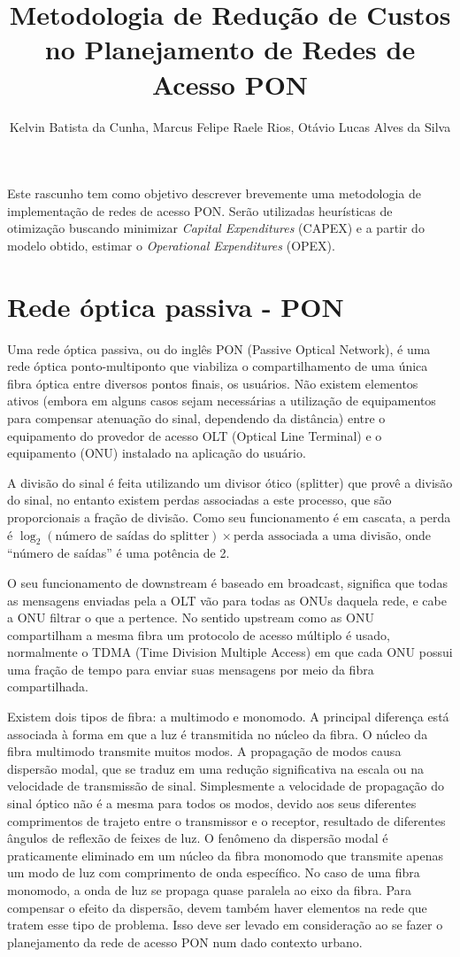 \documentclass[12pt]{article}
\title{Metodologia de Redução de Custos no Planejamento de Redes de Acesso PON}
\author{Kelvin Batista da Cunha\inst{1},
Marcus Felipe Raele Rios\inst{2},
Otávio Lucas Alves da Silva\inst{3}
}
\begin{document}
 

\maketitle
\begin{resumo} 
Este rascunho tem como objetivo  descrever brevemente uma metodologia de implementação de redes de acesso PON.
Serão utilizadas heurísticas de otimização buscando minimizar \textit{Capital Expenditures} (CAPEX) e a partir do modelo obtido, estimar o \textit{Operational Expenditures} (OPEX).
\end{resumo}


\section{Rede óptica passiva - PON}
Uma rede óptica passiva, ou do inglês PON (Passive Optical Network), é uma rede óptica ponto-multiponto que viabiliza o compartilhamento de uma única fibra óptica entre diversos pontos finais, os usuários. Não existem elementos ativos (embora em alguns casos sejam necessárias a utilização de equipamentos para compensar atenuação do sinal, dependendo da distância) entre o equipamento do provedor de acesso OLT (Optical Line Terminal) e o equipamento (ONU) instalado na aplicação do usuário.

A divisão do sinal é feita utilizando um divisor ótico (splitter) que provê a divisão do sinal, no entanto existem perdas associadas a este processo, que são proporcionais a fração de divisão. Como seu funcionamento é em cascata, a perda é $\log_{2}(\mbox{número de saídas do splitter})\times\mbox{perda associada a uma divisão}$, onde ``número de saídas'' é uma potência de 2.

O seu funcionamento de downstream é baseado em broadcast, significa que todas as mensagens enviadas pela a OLT vão para todas as ONUs daquela rede, e cabe a ONU filtrar o que a pertence. No sentido upstream como as ONU compartilham a mesma fibra um protocolo de acesso múltiplo é usado, normalmente o TDMA (Time Division Multiple Access) em que cada ONU possui uma fração de tempo para enviar suas mensagens por meio da fibra compartilhada.

Existem dois tipos de fibra: a multimodo e monomodo. A principal diferença está associada à forma em que a luz é transmitida no núcleo da fibra. O núcleo da fibra multimodo transmite muitos modos. A propagação de modos causa dispersão modal, que se traduz em uma redução significativa na escala ou na velocidade de transmissão de sinal. Simplesmente a velocidade de propagação do sinal óptico não é a mesma para todos os modos, devido aos seus diferentes comprimentos de trajeto entre o transmissor e o receptor, resultado de diferentes ângulos de reflexão de feixes de luz. O fenômeno da dispersão modal é praticamente eliminado em um núcleo da fibra monomodo que transmite apenas um modo de luz com comprimento de onda específico. No caso de uma fibra monomodo, a onda de luz se propaga quase paralela ao eixo da fibra. Para compensar o efeito da dispersão, devem também haver elementos na rede que tratem esse tipo de problema. Isso deve ser levado em consideração ao se fazer o planejamento da rede de acesso PON num dado contexto urbano.
\end{document}
